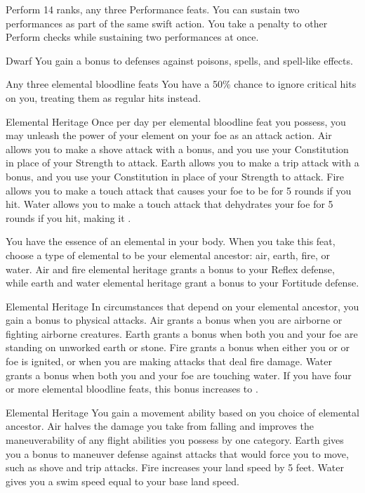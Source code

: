 \featpres Perform 14 ranks, any three Performance feats.
\featben You can sustain two performances as part of the same swift action. You take a  penalty to other Perform checks while sustaining two performances at once.

 Dwarf
 You gain a  bonus to defenses against poisons, spells, and spell-like effects.

\featpre Any three elemental bloodline feats
\featben You have a 50\% chance to ignore critical hits on you, treating them as regular hits instead.

\featpre Elemental Heritage
\featben Once per day per elemental bloodline feat you possess, you may unleash the power of your element on your foe as an attack action. Air allows you to make a shove attack with a  bonus, and you use your Constitution in place of your Strength to attack. Earth allows you to make a trip attack with a  bonus, and you use your Constitution in place of your Strength to attack. Fire allows you to make a touch attack that causes your foe to be \ignited for 5 rounds if you hit. Water allows you to make a touch attack that dehydrates your foe for 5 rounds if you hit, making it \vulnerable.

\featben You have the essence of an elemental in your body. When you take this feat, choose a type of elemental to be your elemental ancestor: air, earth, fire, or water. Air and fire elemental heritage grants a  bonus to your Reflex defense, while earth and water elemental heritage grant a  bonus to your Fortitude defense.

\featpre Elemental Heritage
\featben In circumstances that depend on your elemental ancestor, you gain a  bonus to physical attacks. Air grants a bonus when you are airborne or fighting airborne creatures. Earth grants a bonus when both you and your foe are standing on unworked earth or stone. Fire grants a bonus when either you or or foe is ignited, or when you are making attacks that deal fire damage. Water grants a bonus when both you and your foe are touching water. If you have four or more elemental bloodline feats, this bonus increases to .

\featpre Elemental Heritage
\featben You gain a movement ability based on you choice of elemental ancestor. Air halves the damage you take from falling and improves the maneuverability of any flight abilities you possess by one category. Earth gives you a  bonus to maneuver defense against attacks that would force you to move, such as shove and trip attacks. Fire increases your land speed by 5 feet. Water gives you a swim speed equal to your base land speed.

